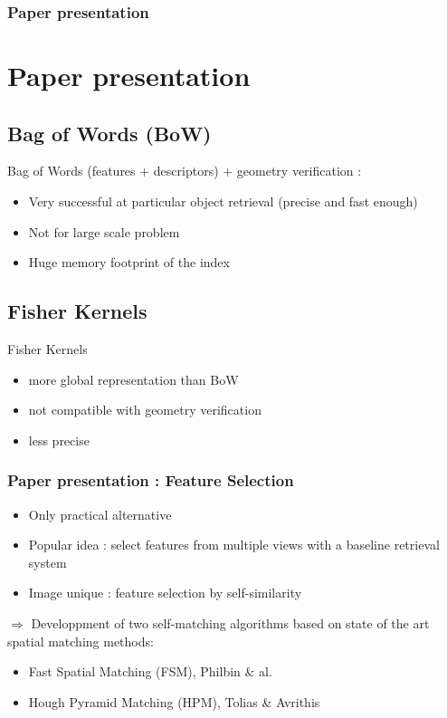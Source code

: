 \documentclass[11pt]{beamer}
\begin{document}
\begin{frame}
\frametitle{Paper presentation}
\section{Paper presentation}

\subsection{Bag of Words (BoW)}
Bag of Words (features + descriptors) + geometry verification :
\begin{itemize}
\item Very successful at particular object retrieval (precise and fast enough)
\item Not for large scale problem
\item Huge memory footprint of the index
\end{itemize}
\vspace{0.3cm}
\subsection{Fisher Kernels}
Fisher Kernels
\begin{itemize}
\item more global representation than BoW
\item not compatible with geometry verification
\item less precise
\end{itemize}

\end{frame}

\begin{frame}
\frametitle{Paper presentation : Feature Selection}
\begin{itemize}
\item Only practical alternative
\item Popular idea : select features from multiple views with a baseline retrieval system
\item Image unique : feature selection by self-similarity
\end{itemize}

$\Rightarrow$ Developpment of two self-matching algorithms based on state of the art spatial matching methods:
\begin{itemize}
\item Fast Spatial Matching (FSM), Philbin \& al.
\item Hough Pyramid Matching (HPM), Tolias \& Avrithis
\end{itemize}

\end{frame}
\end{document}
